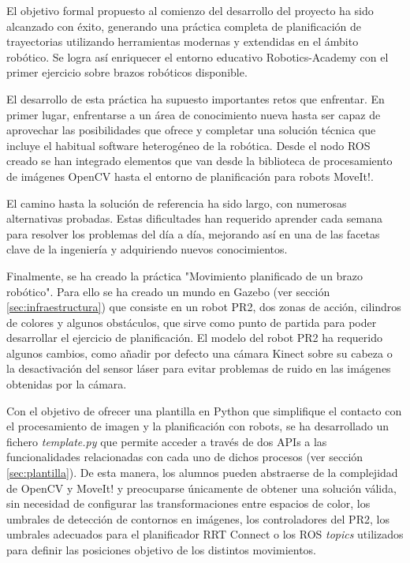 \documentclass[12pt,spanish,chapterprefix, numbers=noenddot]{book}
\numberwithin{equation}{section}
\numberwithin{figure}{section}
\begin{document}
El objetivo formal propuesto al comienzo del desarrollo del proyecto ha sido alcanzado con éxito, generando una práctica completa de planificación de trayectorias utilizando herramientas modernas y extendidas en el ámbito robótico. Se logra así enriquecer el entorno educativo Robotics-Academy con el primer ejercicio sobre brazos robóticos disponible. 

El desarrollo de esta práctica ha supuesto importantes retos que enfrentar. En primer lugar, enfrentarse a un área de conocimiento nueva hasta ser capaz de aprovechar las posibilidades que ofrece y completar una solución técnica que incluye el habitual software heterogéneo de la robótica. Desde el nodo ROS creado se han integrado elementos que van desde la biblioteca de procesamiento de imágenes OpenCV hasta el entorno de planificación para robots MoveIt!.

El camino hasta la solución de referencia ha sido largo, con numerosas alternativas probadas. Estas dificultades han requerido aprender cada semana para resolver los problemas del día a día, mejorando así en una de las facetas clave de la ingeniería y adquiriendo nuevos conocimientos.

Finalmente, se ha creado la práctica "Movimiento planificado de un brazo robótico". Para ello se ha creado un mundo en Gazebo (ver sección \ref{sec:infraestructura}) que consiste en un robot PR2, dos zonas de acción, cilindros de colores y algunos obstáculos, que sirve como punto de partida para poder desarrollar el ejercicio de planificación. El modelo del robot PR2 ha requerido algunos cambios, como añadir por defecto una cámara Kinect sobre su cabeza o la desactivación del sensor láser para evitar problemas de ruido en las imágenes obtenidas por la cámara. 

Con el objetivo de ofrecer una plantilla en Python que simplifique el contacto con el procesamiento de imagen y la planificación con robots, se ha desarrollado un fichero \textit{template.py} que permite acceder a través de dos APIs a las funcionalidades relacionadas con cada uno de dichos procesos (ver sección \ref{sec:plantilla}). De esta manera, los alumnos pueden abstraerse de la complejidad de OpenCV y MoveIt! y preocuparse únicamente de obtener una solución válida, sin necesidad de configurar las transformaciones entre espacios de color, los umbrales de detección de contornos en imágenes, los controladores del PR2, los umbrales adecuados para el planificador RRT Connect o los ROS \textit{topics} utilizados para definir las posiciones objetivo de los distintos movimientos.
\end{document}
